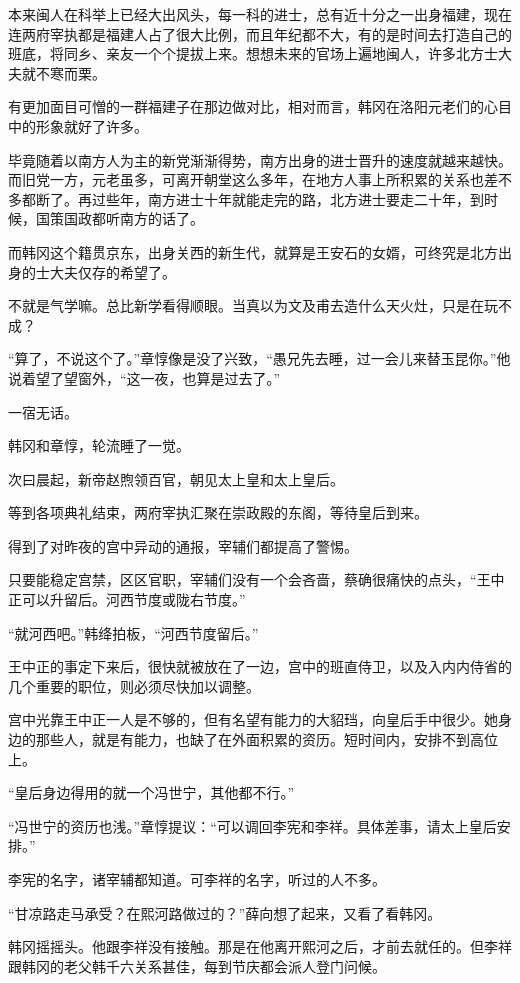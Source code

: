 本来闽人在科举上已经大出风头，每一科的进士，总有近十分之一出身福建，现在连两府宰执都是福建人占了很大比例，而且年纪都不大，有的是时间去打造自己的班底，将同乡、亲友一个个提拔上来。想想未来的官场上遍地闽人，许多北方士大夫就不寒而栗。

有更加面目可憎的一群福建子在那边做对比，相对而言，韩冈在洛阳元老们的心目中的形象就好了许多。

毕竟随着以南方人为主的新党渐渐得势，南方出身的进士晋升的速度就越来越快。而旧党一方，元老虽多，可离开朝堂这么多年，在地方人事上所积累的关系也差不多都断了。再过些年，南方进士十年就能走完的路，北方进士要走二十年，到时候，国策国政都听南方的话了。

而韩冈这个籍贯京东，出身关西的新生代，就算是王安石的女婿，可终究是北方出身的士大夫仅存的希望了。

不就是气学嘛。总比新学看得顺眼。当真以为文及甫去造什么天火灶，只是在玩不成？

“算了，不说这个了。”章惇像是没了兴致，“愚兄先去睡，过一会儿来替玉昆你。”他说着望了望窗外，“这一夜，也算是过去了。”

一宿无话。

韩冈和章惇，轮流睡了一觉。

次曰晨起，新帝赵煦领百官，朝见太上皇和太上皇后。

等到各项典礼结束，两府宰执汇聚在崇政殿的东阁，等待皇后到来。

得到了对昨夜的宫中异动的通报，宰辅们都提高了警惕。

只要能稳定宫禁，区区官职，宰辅们没有一个会吝啬，蔡确很痛快的点头，“王中正可以升留后。河西节度或陇右节度。”

“就河西吧。”韩绛拍板，“河西节度留后。”

王中正的事定下来后，很快就被放在了一边，宫中的班直侍卫，以及入内内侍省的几个重要的职位，则必须尽快加以调整。

宫中光靠王中正一人是不够的，但有名望有能力的大貂珰，向皇后手中很少。她身边的那些人，就是有能力，也缺了在外面积累的资历。短时间内，安排不到高位上。

“皇后身边得用的就一个冯世宁，其他都不行。”

“冯世宁的资历也浅。”章惇提议：“可以调回李宪和李祥。具体差事，请太上皇后安排。”

李宪的名字，诸宰辅都知道。可李祥的名字，听过的人不多。

“甘凉路走马承受？在熙河路做过的？”薛向想了起来，又看了看韩冈。

韩冈摇摇头。他跟李祥没有接触。那是在他离开熙河之后，才前去就任的。但李祥跟韩冈的老父韩千六关系甚佳，每到节庆都会派人登门问候。

